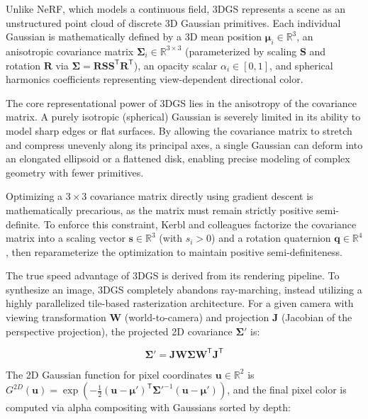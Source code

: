 ﻿\documentclass[12pt,a4paper,oneside]{report}
\begin{document}
Unlike NeRF, which models a continuous field, 3DGS represents a scene as an unstructured point cloud of discrete 3D Gaussian primitives. Each individual Gaussian is mathematically defined by a 3D mean position $\boldsymbol{\mu}_i \in \mathbb{R}^3$, an anisotropic covariance matrix $\boldsymbol{\Sigma}_i \in \mathbb{R}^{3 \times 3}$ (parameterized by scaling $\mathbf{S}$ and rotation $\mathbf{R}$ via $\boldsymbol{\Sigma} = \mathbf{R} \mathbf{S} \mathbf{S}^\mathsf{T} \mathbf{R}^\mathsf{T}$), an opacity scalar $\alpha_i \in [0, 1]$, and spherical harmonics coefficients representing view-dependent directional color.

The core representational power of 3DGS lies in the anisotropy of the covariance matrix. A purely isotropic (spherical) Gaussian is severely limited in its ability to model sharp edges or flat surfaces. By allowing the covariance matrix to stretch and compress unevenly along its principal axes, a single Gaussian can deform into an elongated ellipsoid or a flattened disk, enabling precise modeling of complex geometry with fewer primitives.

Optimizing a $3 \times 3$ covariance matrix directly using gradient descent is mathematically precarious, as the matrix must remain strictly positive semi-definite. To enforce this constraint, Kerbl and colleagues factorize the covariance matrix into a scaling vector $\mathbf{s} \in \mathbb{R}^3$ (with $s_i > 0$) and a rotation quaternion $\mathbf{q} \in \mathbb{R}^4$, then reparameterize the optimization to maintain positive semi-definiteness.

The true speed advantage of 3DGS is derived from its rendering pipeline. To synthesize an image, 3DGS completely abandons ray-marching, instead utilizing a highly parallelized tile-based rasterization architecture. For a given camera with viewing transformation $\mathbf{W}$ (world-to-camera) and projection $\mathbf{J}$ (Jacobian of the perspective projection), the projected 2D covariance $\boldsymbol{\Sigma}'$ is:

\begin{equation}
\boldsymbol{\Sigma}' = \mathbf{J} \mathbf{W} \boldsymbol{\Sigma} \mathbf{W}^\mathsf{T} \mathbf{J}^\mathsf{T}
\end{equation}

The 2D Gaussian function for pixel coordinates $\mathbf{u} \in \mathbb{R}^2$ is $G^{2D}(\mathbf{u}) = \exp\left(-\frac{1}{2} (\mathbf{u} - \boldsymbol{\mu}')^\mathsf{T} \boldsymbol{\Sigma}'^{-1} (\mathbf{u} - \boldsymbol{\mu}')\right)$, and the final pixel color is computed via alpha compositing with Gaussians sorted by depth:
\end{document}
